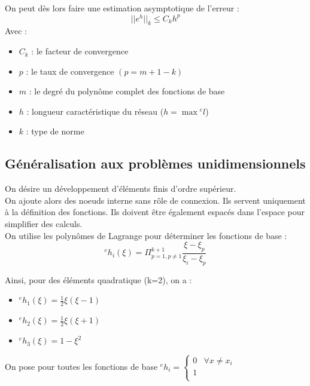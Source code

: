 \documentclass[../main.tex]{subfiles}
\begin{document}
On peut dès lors faire une estimation asymptotique de l'erreur : \begin{equation}
    \lvert \lvert e^h\rvert \rvert_k \leq C_k h^p
\end{equation}
Avec : \begin{itemize}
    \item $C_k$ : le facteur de convergence\\
    \item $p$ : le taux de convergence $(p=m+1-k)$\\
    \item $m$ : le degré du polynôme complet des fonctions de base\\
    \item $h$ : longueur caractéristique du réseau ($h = \max {}^el$)\\
    \item $k$ : type de norme\\
\end{itemize}

\subsection{Généralisation aux problèmes unidimensionnels}
On désire un développement d'éléments finis d'ordre supérieur.\\

On ajoute alors des noeuds interne sans rôle de connexion. Ils servent uniquement à la définition des fonctions. Ils doivent être également espacés dans l'espace pour simplifier des calculs.\\

On utilise les polynômes de Lagrange pour déterminer les fonctions de base : \begin{equation}
    {}^eh_i(\xi) = \Pi_{p=1, p\neq 1}^{k+1} \frac{\xi-\xi_p}{\xi_i-\xi_p}
\end{equation}

Ainsi, pour des éléments quadratique (k=2), on a :\begin{itemize}
    \item ${}^eh_1(\xi) = \frac{1}{2}\xi(\xi-1)$\\
    \item ${}^eh_2(\xi) = \frac{1}{2}\xi(\xi+1)$\\
    \item ${}^eh_3(\xi) = 1-\xi^2$\\
\end{itemize}

\warning On pose pour toutes les fonctions de base ${}^eh_i =\begin{cases}
    0 & \forall x\neq x_i\\
    1\\
\end{cases}$\\
\end{document}

